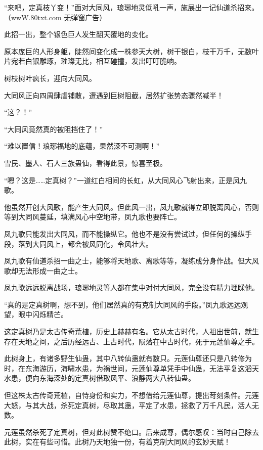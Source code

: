 
\begin{this_body}

“来吧，定真枝丫变！”面对大同风，琅琊地灵低吼一声，施展出一记仙道杀招来。（wwW.80txt.com 无弹窗广告）

此招一出，整个银色巨人发生翻天覆地的变化。

原本庞巨的人形身躯，陡然间变化成一株参天大树，树干银白，枝干万千，无数叶片宛若白银雕琢，璀璨无比，相互碰撞，发出叮叮脆响。

树枝树叶疯长，迎向大同风。

大同风正向四周肆虐铺散，遭遇到巨树阻截，居然扩张势态骤然减半！

“这？！”

“大同风竟然真的被阻挡住了！”

“难以置信！琅琊福地的底蕴，果然深不可测啊！”

雪民、墨人、石人三族蛊仙，看得此景，惊喜至极。

“嗯？这是……定真树？”一道红白相间的长虹，从大同风心飞射出来，正是凤九歌。

他虽然开创大风歌，能产生大同风。但此风一出，凤九歌就得立即脱离风心，否则等到大同风蔓延，填满风心中空地带，凤九歌也要阵亡。

凤九歌只能发出大同风，而不能操纵它。他也不是没有尝试过，但任何的操纵手段，落到大同风上，都会被风同化，令风壮大。

凤九歌有仙道杀招一曲之士，能够将天地歌、离歌等等，凝练成分身作战。但大风歌却无法形成一曲之士。

凤九歌远远脱离战场，琅琊地灵等人都在集中对付大同风，完全没有精力理睬他。

“真的是定真树啊，想不到，他们居然真的有克制大同风的手段。”凤九歌远远观望，眼中闪烁精芒。

这定真树乃是太古传奇荒植，历史上赫赫有名。它从太古时代，人祖出世前，就生存在天地之间，之后历经远古、上古时代，陨落在中古时代，死于元莲仙尊之手。

此树身上，有诸多野生仙蛊，其中八转仙蛊就有数只。元莲仙尊还只是八转修为时，在东海游历，海啸水患，为祸世间，元莲仙尊单凭手中仙蛊，无法平复这滔天水患，便向东海深处的定真树借取风平、浪静两大八转仙蛊。

但这株太古传奇荒植，自恃身份和实力，不想借给元莲仙尊，提出苛刻条件。元莲大怒，与其大战，杀死定真树，尽取其蛊，平定了水患，拯救了万千凡民，活人无数。

元莲虽然杀死了定真树，但对此树赞不绝口。后来成尊，偶尔感叹：当时自己除去此树，实在有些可惜。此树乃天地独一份，有着克制大同风的玄妙天赋！


\end{this_body}
